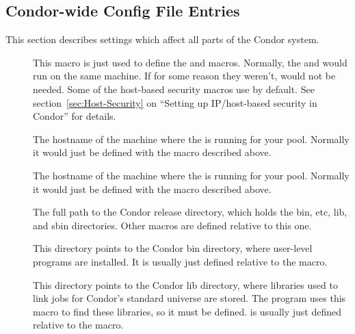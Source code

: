 \subsection{\label{sec:Condor-wide-Config-File-Entries}
Condor-wide Config File Entries}
This section describes settings which affect all parts of the Condor
system. 
\begin{description}
  
\item[] \label{param:CondorHost} This macro is
  just used to define the  and
   macros.  Normally, the 
  and  would run on the same machine.  If for some
  reason they weren't,  would not be needed.  Some
  of the host-based security macros use  by
  default.  See section~\ref{sec:Host-Security} on ``Setting up
  IP/host-based security in Condor'' for details.
  
\item[] \label{param:CollectorHost} The
  hostname of the machine where the  is running for
  your pool.  Normally it would just be defined with the
   macro described above.

\item[] \label{param:NegotiatorHost} The
  hostname of the machine where the  is running for
  your pool.  Normally it would just be defined with the
   macro described above.

\item[] \label{param:ReleaseDir} The full path to
  the Condor release directory, which holds the bin, etc, lib, and
  sbin directories.  Other macros are defined relative to this one.

\item[] \label{param:Bin} This directory points to the
  Condor bin directory, where user-level programs are installed.  It
  is usually just defined relative to the  macro.
  
\item[] \label{param:Lib} This directory points to the
  Condor lib directory, where libraries used to link jobs for Condor's
  standard universe are stored.  The  program uses
  this macro to find these libraries, so it must be defined.
   is usually just defined relative to the
   macro.


\end{description}
